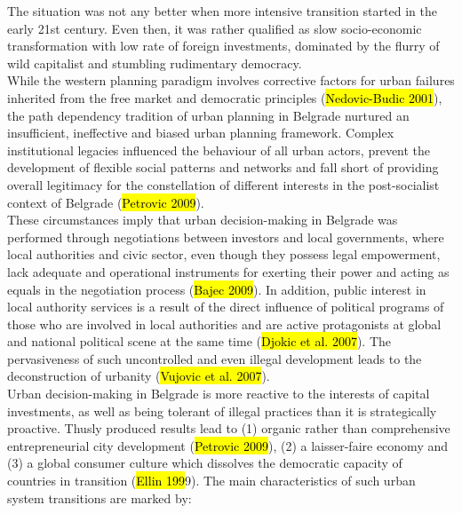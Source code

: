 \documentclass[11pt]{report}
\begin{document}
The situation was not any better when more intensive transition started in the early 21st century. Even then, it was rather qualified as slow socio-economic transformation with low rate of foreign investments,  dominated  by  the  flurry  of  wild  capitalist  and  stumbling  rudimentary democracy.
\\
While the western planning paradigm involves corrective factors for urban failures inherited from the free market and democratic principles (\hl{Nedovic-Budic 2001}), the path dependency tradition of urban planning in Belgrade nurtured an insufficient, ineffective and biased urban  planning  framework. 
Complex institutional  legacies  influenced  the  behaviour  of  all  urban  actors,  prevent  the  development  of  flexible  social  patterns  and networks and fall short of providing overall legitimacy for the constellation of different interests in the post-socialist context of Belgrade (\hl{Petrovic 2009}).
\\
These circumstances imply that urban decision-making in Belgrade was performed through negotiations between investors and local governments, where local authorities and civic sector, even though they possess legal empowerment, lack adequate and  operational  instruments  for  exerting  their  power  and  acting  as  equals  in  the  negotiation  process  (\hl{Bajec  2009}).
In addition, public interest in local authority services is a result of the direct influence of political programs of those who are involved in local authorities and are active protagonists at global and national political scene at the same time (\hl{Djokic et al. 2007}). The pervasiveness of such uncontrolled and even illegal development leads to the deconstruction of urbanity (\hl{Vujovic et al. 2007}).
\\
Urban decision-making in Belgrade is more reactive to the interests of capital investments, as well as being tolerant of illegal practices than it is strategically proactive.
Thusly produced results lead to (1) organic rather than comprehensive entrepreneurial city development (\hl{Petrovic 2009}), (2) a laisser-faire economy and (3) a global consumer culture which dissolves the democratic 
capacity of countries in transition (\hl{Ellin 199}9). The main characteristics of such urban system transitions  are marked by: 
\end{document}
